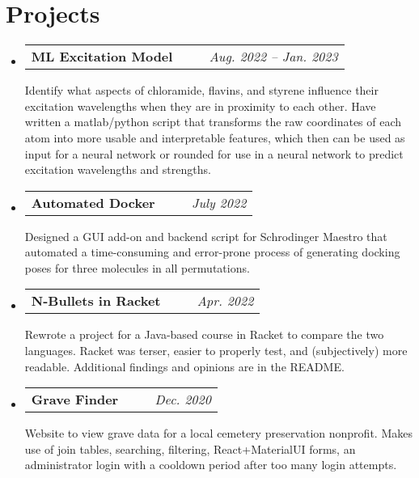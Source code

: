 \documentclass[letterpaper,11pt]{article}
\makeatletter
\newcommand{\resumeSubheading}[5]{
  \vspace{-1pt}\item
    \begin{tabular*}{0.97\textwidth}[t]{c@{\extracolsep{\fill}} r }
      \small\textbf{#1} \headingcap{#3} \ \ \ #2 &  \raggedleft\textit{\small #4} 
    \end{tabular*}
    \small#5
}
\newcommand{\resumeSubHeadingListStart}{\begin{itemize}[leftmargin=*]}
\newcommand{\resumeSubHeadingListEnd}{\end{itemize}}
\makeatother
\begin{document}
  \section{Projects\small{}}
  \resumeSubHeadingListStart \resumeSubheading{ML Excitation Model}{}{Python, Maestro, MATLAB, Bash, TensorFlow}{Aug. 2022 --
  Jan. 2023}{Identify what aspects of chloramide, flavins, and styrene influence
  their excitation wavelengths when they are in proximity to each other. Have
  written a matlab/python script that transforms the raw coordinates of each
  atom into more usable and interpretable features, which then can be used as
  input for a neural network or rounded for use in a neural network to predict
  excitation wavelengths and strengths. } \resumeSubheading{Automated
  Docker}{\ghlink{automated\_docking\_script}}{Python, Maestro, Slurm,
  QtPy}{July 2022}{Designed a GUI add-on and backend script for Schrodinger
  Maestro that automated a time-consuming and error-prone process of generating
  docking poses for three molecules in all permutations.}
  \resumeSubheading{N-Bullets in Racket}{\ghlink{nbulletsrkt}}{Racket}{Apr.
  2022} {Rewrote a project for a Java-based course in Racket to compare the two
  languages. Racket was terser, easier to properly test, and (subjectively) more
  readable. Additional findings and opinions are in the README.}
  \resumeSubheading{Grave Finder}{\ghlink{findagravemiddleborough.ml}}{ReactJS,
  PHP, MySQL, Cloudflare, cPanel, SSL}{Dec. 2020}{Website to view grave data for
  a local cemetery preservation nonprofit. Makes use of join tables, searching,
  filtering, React+MaterialUI forms, an administrator login with a cooldown
  period after too many login attempts. } \resumeSubHeadingListEnd
\end{document}
